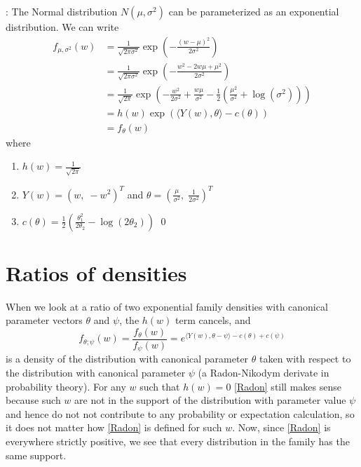 \documentclass[12pt]{article}
\newcommand{\inner}[1]{\langle #1 \rangle}
\begin{document}
\vspace{0.5cm}: The Normal distribution $N(\mu, \sigma^2)$ can be parameterized as an exponential distribution. We can write
\begin{align*}
  	f_{\mu,\sigma^2}(w) &= \frac{1}{\sqrt{2\pi\sigma^2}}\exp\left(-\frac{(w-\mu)^2}{2\sigma^2}\right) \\
  	  &= \frac{1}{\sqrt{2\pi\sigma^2}}\exp\left(-\frac{w^2-2w\mu+\mu^2}{2\sigma^2}\right) \\
  	  &= \frac{1}{\sqrt{2\pi}}\exp\left(-\frac{w^2}{2\sigma^2} + \frac{w\mu}{\sigma^2} - \frac{1}{2}\left(\frac{\mu^2}{\sigma^2} + \log(\sigma^2)\right)\right) \\
 	  &= h(w)\exp\left(\inner{Y(w),\theta} - c(\theta)\right) \\
  	  &= f_\theta(w)
\end{align*}
where 
\begin{enumerate}
	\item[] $h(w) = \frac{1}{\sqrt{2\pi}}$
	\item[] $Y(w) = (w,\; -w^2)^T$ and $\theta = \left(\frac{\mu}{\sigma^2},\; \frac{1}{2\sigma^2}\right)^T$
	\item[] $c(\theta) = \frac{1}{2}\left(\frac{\theta_1^2}{2\theta_2} - \log(2\theta_2)\right)$ \qed
\end{enumerate}


\section*{Ratios of densities}
When we look at a ratio of two exponential family densities with canonical parameter vectors $\theta$ and $\psi$, the $h(w)$ term cancels, and
\begin{equation} \label{Radon}
  f_{\theta;\psi}(w) = \frac{f_{\theta}(w)}{f_{\psi}(w)} = e^{\inner{Y(w),\theta - \psi} - c(\theta) + c(\psi)}	
\end{equation}
is a density of the distribution with canonical parameter $\theta$ taken with respect to the distribution with canonical parameter $\psi$ (a Radon-Nikodym derivate in probability theory). For any $w$ such that $h(w) = 0$ \eqref{Radon} still makes sense because such $w$ are not in the support of the distribution with parameter value $\psi$ and hence do not not contribute to any probability or expectation calculation, so it does not matter how \eqref{Radon} is defined for such $w$. Now, since \eqref{Radon} is everywhere strictly positive, we see that every distribution in the family has the same support.
\end{document}
